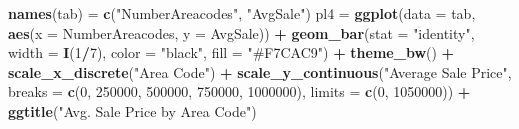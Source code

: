 \documentclass[
]{article}
\newenvironment{Shaded}{\begin{snugshade}}{\end{snugshade}}
\newcommand{\DataTypeTok}[1]{\textcolor[rgb]{0.13,0.29,0.53}{#1}}
\newcommand{\DecValTok}[1]{\textcolor[rgb]{0.00,0.00,0.81}{#1}}
\newcommand{\KeywordTok}[1]{\textcolor[rgb]{0.13,0.29,0.53}{\textbf{#1}}}
\newcommand{\NormalTok}[1]{#1}
\newcommand{\OperatorTok}[1]{\textcolor[rgb]{0.81,0.36,0.00}{\textbf{#1}}}
\newcommand{\StringTok}[1]{\textcolor[rgb]{0.31,0.60,0.02}{#1}}
\begin{document}
\begin{Shaded}
\begin{Highlighting}[]
{{{{{{\KeywordTok{names}\NormalTok{(tab) =}\StringTok{ }\KeywordTok{c}\NormalTok{(}\StringTok{"NumberAreacodes"}\NormalTok{, }\StringTok{"AvgSale"}\NormalTok{)}
\NormalTok{pl4 =}\StringTok{ }\KeywordTok{ggplot}\NormalTok{(}\DataTypeTok{data =}\NormalTok{ tab, }\KeywordTok{aes}\NormalTok{(}\DataTypeTok{x =}\NormalTok{ NumberAreacodes, }\DataTypeTok{y =}\NormalTok{ AvgSale)) }\OperatorTok{+}\StringTok{ }
\StringTok{  }\KeywordTok{geom_bar}\NormalTok{(}\DataTypeTok{stat =} \StringTok{"identity"}\NormalTok{, }\DataTypeTok{width =} \KeywordTok{I}\NormalTok{(}\DecValTok{1}\OperatorTok{/}\DecValTok{7}\NormalTok{), }\DataTypeTok{color =} \StringTok{"black"}\NormalTok{, }\DataTypeTok{fill =} \StringTok{"#F7CAC9"}\NormalTok{) }\OperatorTok{+}\StringTok{ }\KeywordTok{theme_bw}\NormalTok{() }\OperatorTok{+}\StringTok{ }\KeywordTok{scale_x_discrete}\NormalTok{(}\StringTok{"Area Code"}\NormalTok{) }\OperatorTok{+}
\StringTok{  }\KeywordTok{scale_y_continuous}\NormalTok{(}\StringTok{"Average Sale Price"}\NormalTok{, }\DataTypeTok{breaks =} \KeywordTok{c}\NormalTok{(}\DecValTok{0}\NormalTok{, }\DecValTok{250000}\NormalTok{, }\DecValTok{500000}\NormalTok{, }\DecValTok{750000}\NormalTok{, }\DecValTok{1000000}\NormalTok{), }\DataTypeTok{limits =} \KeywordTok{c}\NormalTok{(}\DecValTok{0}\NormalTok{, }\DecValTok{1050000}\NormalTok{)) }\OperatorTok{+}\StringTok{ }
\StringTok{  }\KeywordTok{ggtitle}\NormalTok{(}\StringTok{"Avg. Sale Price by Area Code"}\NormalTok{)}

}}}}}}
\end{Highlighting}
\end{Shaded}
\end{document}
